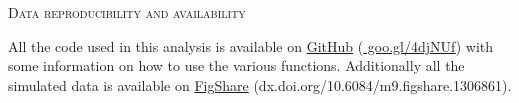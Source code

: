 \documentclass[12pt,letterpaper]{article}
\renewcommand{\section}[1]{%
\bigskip
\begin{center}
\begin{Large}
\normalfont\scshape #1
\medskip
\end{Large}
\end{center}}
\begin{document}
\section{Data reproducibility and availability}
 All the code used in this analysis is available on \href{https://github.com/TGuillerme/Total_Evidence_Method-Missing_data}{GitHub} (\href{https://github.com/TGuillerme/Total_Evidence_Method-Missing_data}{    
goo.gl/4djNUf}) with some information on how to use the various functions. Additionally all the simulated data is available on \href{http://figshare.com/articles/Effect_of_missing_data_on_topological_inference_using_a_total_evidence_approach/1306861}{FigShare} (dx.doi.org/10.6084/m9.figshare.1306861).
\end{document}
